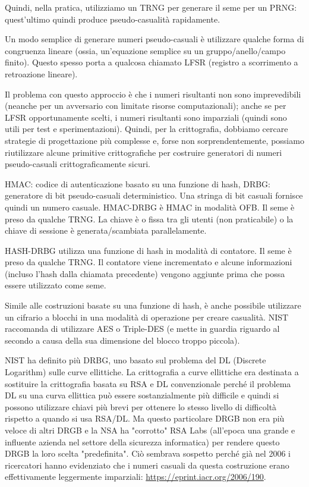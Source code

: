 \documentclass[11pt]{article}
\theoremstyle{definition} \newtheorem{definizione}{Definizione}[section] %
\begin{document}
        Quindi, nella pratica, utilizziamo un TRNG per generare il seme per un PRNG: quest'ultimo quindi produce pseudo-casualità rapidamente.

        Un modo semplice di generare numeri pseudo-casuali è utilizzare qualche forma di congruenza lineare (ossia, un'equazione semplice su un gruppo/anello/campo finito). Questo spesso porta a qualcosa chiamato LFSR (registro a scorrimento a retroazione lineare).

        Il problema con questo approccio è che i numeri risultanti non sono imprevedibili (neanche per un avversario con limitate risorse computazionali); anche se per LFSR opportunamente scelti, i numeri risultanti sono imparziali (quindi sono utili per test e sperimentazioni). Quindi, per la crittografia, dobbiamo cercare strategie di progettazione più complesse e, forse non sorprendentemente, possiamo riutilizzare alcune primitive crittografiche per costruire generatori di numeri pseudo-casuali crittograficamente sicuri.

        HMAC: codice di autenticazione basato su una funzione di hash, DRBG: generatore di bit pseudo-casuali deterministico. Una stringa di bit casuali fornisce quindi un numero casuale. HMAC-DRBG è HMAC in modalità OFB. Il seme è preso da qualche TRNG. La chiave è o fissa tra gli utenti (non praticabile) o la chiave di sessione è generata/scambiata parallelamente.

        HASH-DRBG utilizza una funzione di hash in modalità di contatore. Il seme è preso da qualche TRNG. Il contatore viene incrementato e alcune informazioni (incluso l'hash dalla chiamata precedente) vengono aggiunte prima che possa essere utilizzato come seme.

        Simile alle costruzioni basate su una funzione di hash, è anche possibile utilizzare un cifrario a blocchi in una modalità di operazione per creare casualità. NIST raccomanda di utilizzare AES o Triple-DES (e mette in guardia riguardo al secondo a causa della sua dimensione del blocco troppo piccola).

        NIST ha definito più DRBG, uno basato sul problema del DL (Discrete Logarithm) sulle curve ellittiche. La crittografia a curve ellittiche era destinata a sostituire la crittografia basata su RSA e DL convenzionale perché il problema DL su una curva ellittica può essere sostanzialmente più difficile e quindi si possono utilizzare chiavi più brevi per ottenere lo stesso livello di difficoltà rispetto a quando si usa RSA/DL. Ma questo particolare DRGB non era più veloce di altri DRGB e la NSA ha "corrotto" RSA Labs (all'epoca una grande e influente azienda nel settore della sicurezza informatica) per rendere questo DRGB la loro scelta "predefinita".
        Ciò sembrava sospetto perché già nel 2006 i ricercatori hanno evidenziato che i numeri casuali da questa costruzione erano effettivamente leggermente imparziali: \url{https://eprint.iacr.org/2006/190}.
\end{document}

